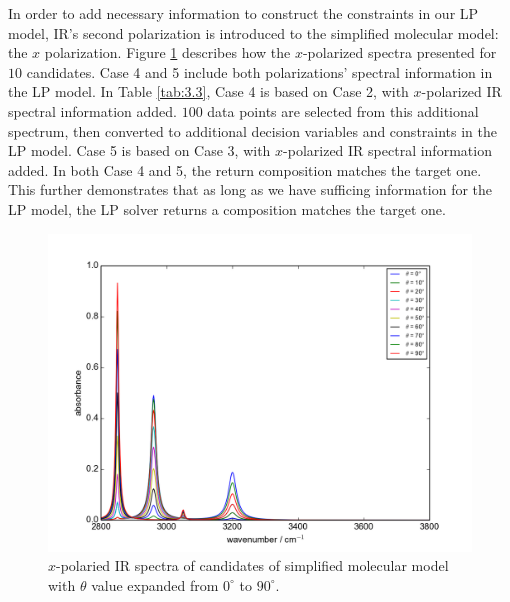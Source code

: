 In order to add necessary information to construct the constraints in our LP model, IR's second polarization is introduced to the simplified molecular model: the $x$ polarization. Figure \ref{fig:3.4} describes how the $x$-polarized spectra presented for $10$ candidates. Case 4 and 5 include both polarizations' spectral information in the LP model. In Table \ref{tab:3.3}, Case 4 is based on Case 2, with $x$-polarized IR spectral information added. $100$ data points are selected from this additional spectrum, then converted to additional decision variables and constraints in the LP model. Case 5 is based on Case 3, with $x$-polarized IR spectral information added. In both Case 4 and 5, the return composition matches the target one. This further demonstrates that as long as we have sufficing information for the LP model, the LP solver returns a composition matches the target one. \\ 

\begin{figure}[!ht]
\centering
\includegraphics[scale=0.7]{Figures/Toy_Model_IR_Sine_Projection.png} 
\caption{$x$-polaried IR spectra of candidates of simplified molecular model with $\theta$ value expanded from $0^{\circ}$ to $90^{\circ}$.}  \label{fig:3.4}
\end{figure}


